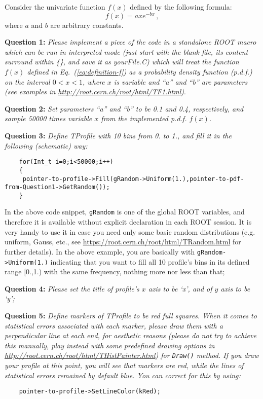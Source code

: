 \documentclass[11pt]{article}
\begin{document}
\bigskip\bigskip\bigskip

\noindent Consider the univariate function $f(x)$ defined by the following formula:
% 
\begin{equation}
f(x) = axe^{-bx}\,,
\label{eq:definition-f}
\end{equation}
%
where $a$ and $b$ are arbitrary constants.

\bigskip

\noindent\textbf{Question 1:} {\it Please implement a piece of the code in a standalone ROOT macro which can be run in interpreted mode (just start with the blank file, its content surround within \{\}, and save it as yourFile.C) which will treat the function $f(x)$ defined in Eq.~(\ref{eq:definition-f}) as a probability density function (p.d.f.) on the interval $0 < x < 1$, where $x$ is variable and ``a'' and ``b'' are parameters (see examples in \url{http://root.cern.ch/root/html/TF1.html})}.

\bigskip

\noindent\textbf{Question 2:} {\it Set parameters ``a'' and ``b'' to be 0.1 and 0.4, respectively, and sample 50000 times variable $x$ from the implemented p.d.f. $f(x)$.}

\bigskip\newpage

\noindent\textbf{Question 3:} {\it Define TProfile with 10 bins from 0. to 1., and fill it in the following (schematic) way:}
% 
{\small
\begin{verbatim}
    for(Int_t i=0;i<50000;i++) 
    {
     pointer-to-profile->Fill(gRandom->Uniform(1.),pointer-to-pdf-from-Question1->GetRandom());
    }
\end{verbatim}
}
%
\noindent In the above code snippet, \verb|gRandom| is one of the global ROOT variables, and therefore it is available without explicit declaration in each ROOT session. It is very handy to use it in case you need only some basic random distributions (e.g. uniform, Gauss, etc., see \url{https://root.cern.ch/root/html/TRandom.html} for further details). In the above example, you are basically with \verb|gRandom->Uniform(1.)| indicating that you want to fill all 10 profile's bins in its defined range [0.,1.) with the same frequency, nothing more nor less than that;


\bigskip

\noindent\textbf{Question 4:} {\it Please set the title of profile's $x$ axis to be `x', and of $y$ axis to be `y'; }

\bigskip

\noindent\textbf{Question 5:} {\it Define markers of TProfile to be red full squares. When it comes to statistical errors associated with each marker, please draw them with a perpendicular line at each end, for aesthetic reasons (please do not try to achieve this manually, play instead with some predefined drawing options in \url{http://root.cern.ch/root/html/THistPainter.html}) for \verb|Draw()| method. If you draw your profile at this point, you will see that markers are red, while the lines of statistical errors remained by default blue. You can correct for this by using:}
%
{\small
\begin{verbatim}
    pointer-to-profile->SetLineColor(kRed);
\end{verbatim}
}
\end{document}
